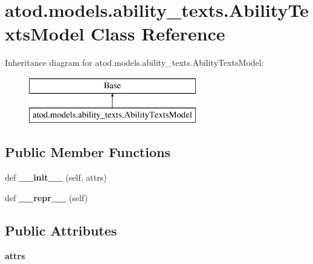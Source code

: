 \hypertarget{classatod_1_1models_1_1ability__texts_1_1_ability_texts_model}{}\section{atod.\+models.\+ability\+\_\+texts.\+Ability\+Texts\+Model Class Reference}
\label{classatod_1_1models_1_1ability__texts_1_1_ability_texts_model}
Inheritance diagram for atod.\+models.\+ability\+\_\+texts.\+Ability\+Texts\+Model\+:\begin{figure}[H]
\begin{center}
\leavevmode
\includegraphics[height=2.000000cm]{classatod_1_1models_1_1ability__texts_1_1_ability_texts_model}
\end{center}
\end{figure}
\subsection*{Public Member Functions}
\begin{DoxyCompactItemize}
\item 
def {\bfseries \+\_\+\+\_\+init\+\_\+\+\_\+} (self, attrs)\hypertarget{classatod_1_1models_1_1ability__texts_1_1_ability_texts_model_ac7badf15d77512cbdf61481bdbdeb591}{}\label{classatod_1_1models_1_1ability__texts_1_1_ability_texts_model_ac7badf15d77512cbdf61481bdbdeb591}

\item 
def {\bfseries \+\_\+\+\_\+repr\+\_\+\+\_\+} (self)\hypertarget{classatod_1_1models_1_1ability__texts_1_1_ability_texts_model_ac10f7d190ef5dd2a23cbbfad8bf40301}{}\label{classatod_1_1models_1_1ability__texts_1_1_ability_texts_model_ac10f7d190ef5dd2a23cbbfad8bf40301}

\end{DoxyCompactItemize}
\subsection*{Public Attributes}
\begin{DoxyCompactItemize}
\item 
{\bfseries attrs}\hypertarget{classatod_1_1models_1_1ability__texts_1_1_ability_texts_model_ac6648f2410ed0592e010e167643ce1d8}{}\label{classatod_1_1models_1_1ability__texts_1_1_ability_texts_model_ac6648f2410ed0592e010e167643ce1d8}

\end{DoxyCompactItemize}
